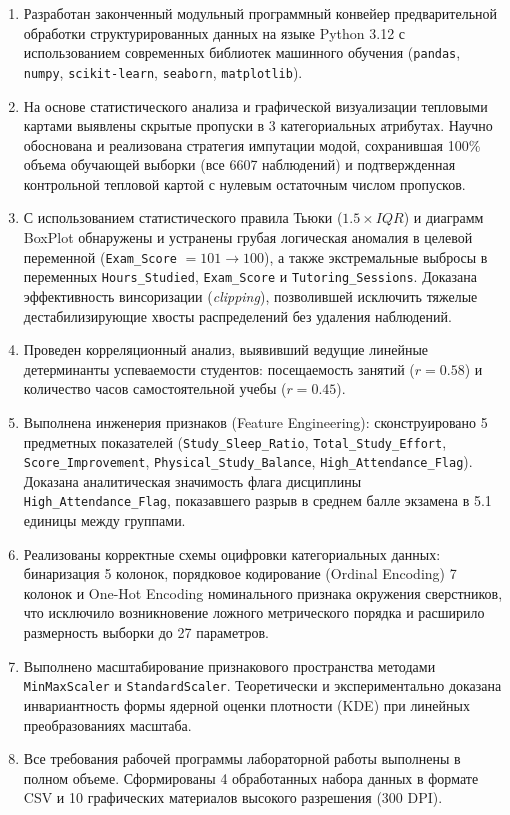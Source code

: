 \documentclass[14pt,a4paper]{extarticle}
\begin{document}
\begin{enumerate}
    \item Разработан законченный модульный программный конвейер предварительной обработки структурированных данных на языке Python 3.12 с использованием современных библиотек машинного обучения (\texttt{pandas}, \texttt{numpy}, \texttt{scikit-learn}, \texttt{seaborn}, \texttt{matplotlib}).
    \item На основе статистического анализа и графической визуализации тепловыми картами выявлены скрытые пропуски в 3 категориальных атрибутах. Научно обоснована и реализована стратегия импутации модой, сохранившая 100\% объема обучающей выборки (все 6607 наблюдений) и подтвержденная контрольной тепловой картой с нулевым остаточным числом пропусков.
    \item С использованием статистического правила Тьюки ($1.5 \times IQR$) и диаграмм BoxPlot обнаружены и устранены грубая логическая аномалия в целевой переменной (\texttt{Exam\_Score} $= 101 \to 100$), а также экстремальные выбросы в переменных \texttt{Hours\_Studied}, \texttt{Exam\_Score} и \texttt{Tutoring\_Sessions}. Доказана эффективность винсоризации (\textit{clipping}), позволившей исключить тяжелые дестабилизирующие хвосты распределений без удаления наблюдений.
    \item Проведен корреляционный анализ, выявивший ведущие линейные детерминанты успеваемости студентов: посещаемость занятий ($r = 0.58$) и количество часов самостоятельной учебы ($r = 0.45$).
    \item Выполнена инженерия признаков (Feature Engineering): сконструировано 5 предметных показателей (\texttt{Study\_Sleep\_Ratio}, \texttt{Total\_Study\_Effort}, \texttt{Score\_Improvement}, \texttt{Physical\_Study\_Balance}, \texttt{High\_Attendance\_Flag}). Доказана аналитическая значимость флага дисциплины \texttt{High\_Attendance\_Flag}, показавшего разрыв в среднем балле экзамена в 5.1 единицы между группами.
    \item Реализованы корректные схемы оцифровки категориальных данных: бинаризация 5 колонок, порядковое кодирование (Ordinal Encoding) 7 колонок и One-Hot Encoding номинального признака окружения сверстников, что исключило возникновение ложного метрического порядка и расширило размерность выборки до 27 параметров.
    \item Выполнено масштабирование признакового пространства методами \texttt{MinMaxScaler} и \texttt{StandardScaler}. Теоретически и экспериментально доказана инвариантность формы ядерной оценки плотности (KDE) при линейных преобразованиях масштаба.
    \item Все требования рабочей программы лабораторной работы выполнены в полном объеме. Сформированы 4 обработанных набора данных в формате CSV и 10 графических материалов высокого разрешения (300 DPI).
\end{enumerate}
\end{document}
